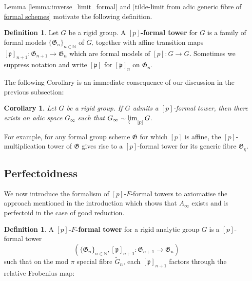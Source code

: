 \documentclass[10pt,oneside]{amsart}
\newtheorem{corollary}[theorem]{Corollary}
\theoremstyle{definition}
\newtheorem{definition}[theorem]{Definition}
\begin{document}
	Lemma \ref{lemma:inverse_limit_formal} and  \ref{tilde-limit from adic generic fibre of formal schemes} motivate the following definition. 
	\begin{definition}
	Let $G$ be a rigid group. A \textbf{$[p]$-formal tower} for $G$ is  a family of formal models $\{\mathfrak G_n\}_{n\in \mathbb N}$ of $G$, together with affine transition maps $[\mathfrak p]_{n+1}:\mathfrak G_{n+1}\rightarrow \mathfrak G_{n}$ which are formal models of $[p]:G\rightarrow G$. Sometimes we suppress notation and write $[\mathfrak p]$ for $[\mathfrak p]_{n}$ on $\mathfrak G_n$. 
	\end{definition}
	
	The following Corollary is an immediate consequence of our discussion in the previous subsection:
	\begin{corollary}
		Let $G$ be a rigid group. If $G$ admits a $[p]$-formal tower, then there exists an adic space $G_\infty$ such that $G_\infty \sim \varprojlim_{[p]}G$.
	\end{corollary}
	For example, for any formal group scheme $\mathfrak G$ for which $[p]$ is affine, the $[p]$-multiplication tower of $\mathfrak G$ gives rise to a $[p]$-formal tower for its generic fibre $\mathfrak G_\eta$. 
	
	
	
	
	\subsection{Perfectoidness}  \label{subsection:perfectoid_tilde_limit}

We now introduce the formalism of $[p]$-$F$-formal towers to axiomatise the approach mentioned in the introduction which shows that $A_\infty$ exists and is perfectoid in the case of good reduction.
	
	\begin{definition}
		A \textbf{$[p]$-$F$-formal tower} for a rigid analytic group $G$ is a $[p]$-formal tower 
		$$(\{\mathfrak G_n\}_{n\in \mathbb N}, [\mathfrak p]_{n+1}:\mathfrak G_{n+1}\rightarrow \mathfrak G_{n})$$ such that on the mod $\pi$ special fibre  $\tilde{G}_n$, each   $[\mathfrak p]_{n+1}$ factors through the relative Frobenius map:
				\begin{center}
				\end{center}
	 
	\end{definition}	
	
\end{document}
